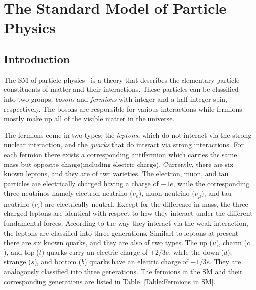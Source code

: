 \setcounter{section}{2}
\setcounter{subsection}{2}
\setcounter{subsubsection}{2}
\setcounter{equation}{0}
\chapter{The Standard Model of Particle Physics \label{The Standard Model of Particle Physics}}
\section{Introduction}
The SM of particle physics~\cite{sm, APichSM} is a theory that describes the elementary particle constituents of matter and their interactions. These particles can be classified into two groups, \textit{bosons} and \textit{fermions} with integer and a half-integer spin, respectively. The bosons are responsible for various interactions while fermions mostly make up all of the visible matter in the universe. 

The fermions come in two types: the \textit{leptons}, which do not interact via the strong nuclear interaction, and the \textit{quarks} that do interact via strong interactions. For each fermion there exists a corresponding antifermion which carries the same mass but opposite charge(including electric charge). Currently, there are six known leptons, and they are of two varieties. The electron, muon, and tau particles are electrically charged having a charge of $-1e$, while the corresponding three neutrinos namely electron neutrino ($\nu_e$), muon neutrino ($\nu_\mu$), and tau neutrino ($\nu_\tau$) are electrically neutral. Except for the difference in mass, the three charged leptons are identical with respect to how they interact under the different fundamental forces. According to the way they interact via the weak interaction, the leptons are classified into three generations. Similarl to leptons at present there are six known quarks, and they are also of two types. The up ($u$), charm ($c$), and top ($t$) quarks carry an electric charge of $+2/3e$, while the down ($d$), strange ($s$), and bottom ($b$) quarks have an electric charge of $-1/3e$. They are analogously classified into three generations. The fermions in the SM and their corresponding generations are listed in Table~\ref{Table:Fermions in SM}.


